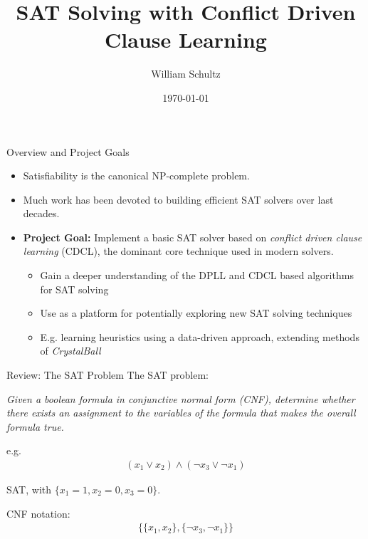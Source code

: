 \documentclass{beamer}
\title{SAT Solving with Conflict Driven Clause Learning}
\author{William Schultz}
\institute{CS 7240 Final Project}
\date{\today}
\begin{document}
\newcommand{\green}[1]{\textcolor{green}{#1}}
\newcommand{\red}[1]{\textcolor{red}{#1}}

\begin{frame}
    \titlepage
\end{frame}

\begin{frame}{Overview and Project Goals}
\begin{itemize}
    \item Satisfiability is the canonical NP-complete problem.
    
    \item Much work has been devoted to building efficient SAT solvers over last decades.\\
    
    \item \textbf{Project Goal:} Implement a basic SAT solver based on \textit{conflict driven clause learning} (CDCL), the dominant core technique used in modern solvers.
    \begin{itemize}
        \item Gain a deeper understanding of the DPLL and CDCL based algorithms for SAT solving
        \item Use as a platform for potentially exploring new SAT solving techniques 
        \item E.g. learning heuristics using a data-driven approach, extending methods of \textit{CrystalBall} \cite{2019sooscrystalball}
    \end{itemize}
\end{itemize}
\end{frame}

\begin{frame}{Review: The SAT Problem}
    The SAT problem:
    \vspace{12pt}

    \textit{Given a boolean formula in conjunctive normal form (CNF), determine whether there exists an assignment to the variables of the formula that makes the overall formula true.}

    \pause
    \vspace{12pt}
    e.g.
    \begin{align*}
        (x_1 \vee x_2) \wedge (\neg x_3 \vee \neg x_1)
    \end{align*}
    \pause
    \begin{center}
        SAT, with $\{x_1=1,x_2=0,x_3=0\}$. 
    \end{center}
    \pause
    CNF notation:
    \begin{align*}
        \{\{x_1, x_2\}, \{\neg x_3, \neg x_1\}\}
    \end{align*}
\end{frame}
\end{document}
